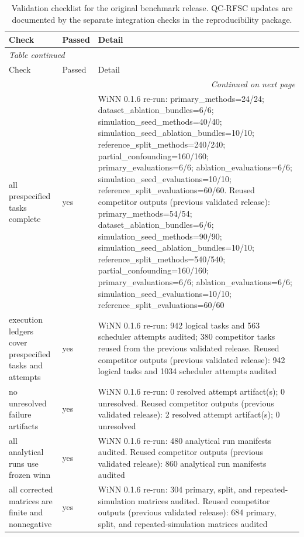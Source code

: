 \tiny
\begin{longtable}{llp{10.5cm}}
\caption{Validation checklist for the original benchmark release. QC-RFSC updates are documented by the separate integration checks in the reproducibility package.}\label{tab:supp_validation}\\
\toprule
Check & Passed & Detail \\
\midrule
\endfirsthead
\multicolumn{3}{l}{\textit{Table \thetable{} continued}}\\
\toprule
Check & Passed & Detail \\
\midrule
\endhead
\midrule
\multicolumn{3}{r}{\textit{Continued on next page}}\\
\endfoot
\bottomrule
\endlastfoot
all prespecified tasks complete & yes & WiNN 0.1.6 re-run: primary\_methods=24/24; dataset\_ablation\_bundles=6/6; simulation\_seed\_methods=40/40; simulation\_seed\_ablation\_bundles=10/10; reference\_split\_methods=240/240; partial\_confounding=160/160; primary\_evaluations=6/6; ablation\_evaluations=6/6; simulation\_seed\_evaluations=10/10; reference\_split\_evaluations=60/60. Reused competitor outputs (previous validated release): primary\_methods=54/54; dataset\_ablation\_bundles=6/6; simulation\_seed\_methods=90/90; simulation\_seed\_ablation\_bundles=10/10; reference\_split\_methods=540/540; partial\_confounding=160/160; primary\_evaluations=6/6; ablation\_evaluations=6/6; simulation\_seed\_evaluations=10/10; reference\_split\_evaluations=60/60 \\
execution ledgers cover prespecified tasks and attempts & yes & WiNN 0.1.6 re-run: 942 logical tasks and 563 scheduler attempts audited; 380 competitor tasks reused from the previous validated release. Reused competitor outputs (previous validated release): 942 logical tasks and 1034 scheduler attempts audited \\
no unresolved failure artifacts & yes & WiNN 0.1.6 re-run: 0 resolved attempt artifact(s); 0 unresolved. Reused competitor outputs (previous validated release): 2 resolved attempt artifact(s); 0 unresolved \\
all analytical runs use frozen winn & yes & WiNN 0.1.6 re-run: 480 analytical run manifests audited. Reused competitor outputs (previous validated release): 860 analytical run manifests audited \\
all corrected matrices are finite and nonnegative & yes & WiNN 0.1.6 re-run: 304 primary, split, and repeated-simulation matrices audited. Reused competitor outputs (previous validated release): 684 primary, split, and repeated-simulation matrices audited \\

\end{longtable}
